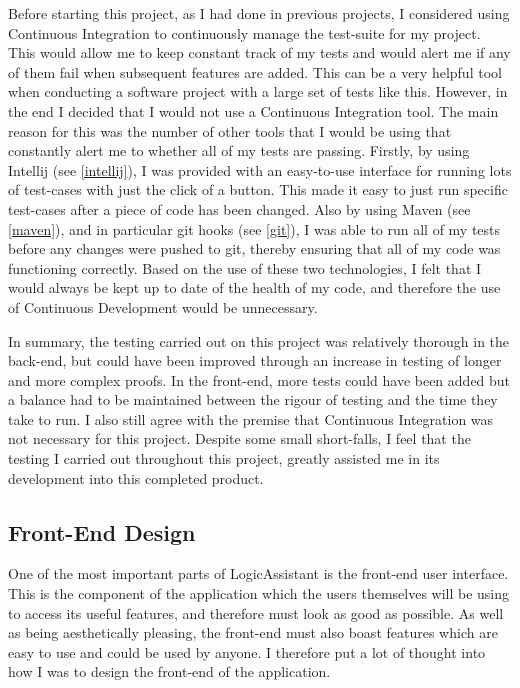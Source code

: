 Before starting this project, as I had done in previous projects, I considered using Continuous Integration to continuously manage the test-suite for my project. This would allow me to keep constant track of my tests and would alert me if any of them fail when subsequent features are added. This can be a very helpful tool when conducting a software project with a large set of tests like this. However, in the end I decided that I would not use a Continuous Integration tool. The main reason for this was the number of other tools that I would be using that constantly alert me to whether all of my tests are passing. Firstly, by using Intellij (see \ref{intellij}), I was provided with an easy-to-use interface for running lots of test-cases with just the click of a button. This made it easy to just run specific test-cases after a piece of code has been changed. Also by using Maven (see \ref{maven}), and in particular git hooks (see \ref{git}), I was able to run all of my tests before any changes were pushed to git, thereby ensuring that all of my code was functioning correctly. Based on the use of these two technologies, I felt that I would always be kept up to date of the health of my code, and therefore the use of Continuous Development would be unnecessary.

In summary, the testing carried out on this project was relatively thorough in the back-end, but could have been improved through an increase in testing of longer and more complex proofs. In the front-end, more tests could have been added but a balance had to be maintained between the rigour of testing and the time they take to run. I also still agree with the premise that Continuous Integration was not necessary for this project. Despite some small short-falls, I feel that the testing I carried out throughout this project, greatly assisted me in its development into this completed product.

\subsection{Front-End Design}

One of the most important parts of LogicAssistant is the front-end user interface. This is the component of the application which the users themselves will be using to access its useful features, and therefore must look as good as possible. As well as being aesthetically pleasing, the front-end must also boast features which are easy to use and could be used by anyone. I therefore put a lot of thought into how I was to design the front-end of the application.

